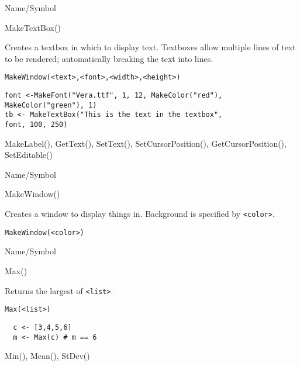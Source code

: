 \begin{desc}{Name/Symbol}
\item[Name/Symbol]	MakeTextBox()

\item[Description]	Creates a textbox in which to display text. 
		Textboxes allow multiple lines of text to be rendered;
		automatically breaking the text into lines. 

\item[Usage]
\begin{verbatim}
MakeWindow(<text>,<font>,<width>,<height>)
\end{verbatim}

\item[Example]	
\begin{verbatim}
font <-MakeFont("Vera.ttf", 1, 12, MakeColor("red"), 
MakeColor("green"), 1)
tb <- MakeTextBox("This is the text in the textbox", 
font, 100, 250)
\end{verbatim}

\item[See Also]	MakeLabel(), GetText(), SetText(), SetCursorPosition(),
		GetCursorPosition(), SetEditable()
\end{desc}

\rl


\begin{desc}{Name/Symbol}
\item[Name/Symbol]	MakeWindow() 

\item[Description]	Creates a window to display things in.
		Background is specified by \verb+<color>+.

\item[Usage]		
\begin{verbatim}
MakeWindow(<color>)
\end{verbatim}

\item[Example]	

\item[See Also]	
\end{desc}

\rl


\begin{desc}{Name/Symbol}
\item[Name/Symbol]	Max()            

\item[Description] Returns the largest of \verb+<list>+.

\item[Usage]		
\begin{verbatim}
Max(<list>)
\end{verbatim}

\item[Example]	
\begin{verbatim} 
  c <- [3,4,5,6]
  m <- Max(c) # m == 6
\end{verbatim}

\item[See Also]	Min(), Mean(), StDev()
\end{desc}

